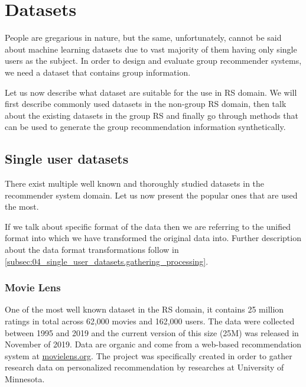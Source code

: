 \chapter{Datasets}  \label{chap:datasets}
People are gregarious in nature, but the same, unfortunately, cannot be said about machine learning datasets due to vast majority of them having only single users as the subject. In order to design and evaluate group recommender systems, we need a dataset that contains group information.

Let us now describe what dataset are suitable for the use in RS domain. We will first describe commonly used datasets in the non-group RS domain, then talk about the existing datasets in the group RS and finally go through methods that can be used to generate the group recommendation information synthetically.



\section{Single user datasets}
There exist multiple well known and thoroughly studied datasets in the recommender system domain. Let us now present the popular ones that are used the most.

If we talk about specific format of the data then we are referring to the unified format into which we have transformed the original data into. Further description about the data format transformations follow in \ref{subsec:04_single_user_datasets.gathering_processing}.



\subsection{Movie Lens}
One of the most well known dataset in the RS domain, it contains 25 million ratings in total across 62,000 movies and 162,000 users. The data were collected between 1995 and 2019 and the current version of this size (25M) was released in November of 2019. Data are organic and come from a web-based recommendation system at \href{https://movielens.org/}{movielens.org}. The project was specifically created in order to gather research data on personalized recommendation by researches at University of Minnesota.

